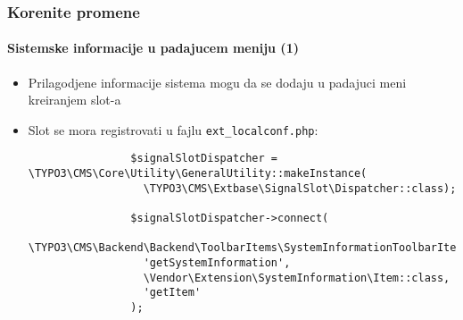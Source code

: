 \begin{frame}[fragile]
	\frametitle{Korenite promene}
	\framesubtitle{Sistemske informacije u padajucem meniju (1)}

	\lstset{basicstyle=\tiny\ttfamily}

	\begin{itemize}
		\item Prilagodjene informacije sistema mogu da se dodaju u padajuci meni kreiranjem slot-a

		\item Slot se mora registrovati u fajlu \texttt{ext\_localconf.php}:

			\begin{lstlisting}
				$signalSlotDispatcher = \TYPO3\CMS\Core\Utility\GeneralUtility::makeInstance(
				  \TYPO3\CMS\Extbase\SignalSlot\Dispatcher::class);

				$signalSlotDispatcher->connect(
				  \TYPO3\CMS\Backend\Backend\ToolbarItems\SystemInformationToolbarItem::class,
				  'getSystemInformation',
				  \Vendor\Extension\SystemInformation\Item::class,
				  'getItem'
				);
			\end{lstlisting}

	\end{itemize}

\end{frame}

